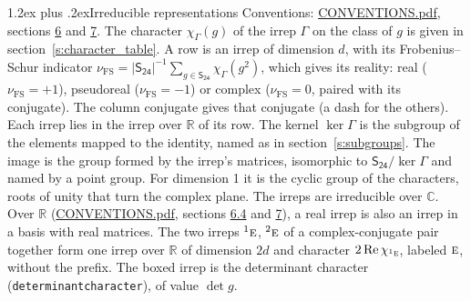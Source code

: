 \documentclass[10pt,a4paper]{article}
\makeatletter
\renewcommand\section{\@startsection{section}{1}{\z@}{-3ex plus -1ex minus -.2ex}%
  {1.2ex plus .2ex}{\normalfont\large\sffamily\bfseries\color{parttitle}}}
\numberwithin{equation}{section}
\newcommand{\grp}[1]{\mathsf{#1}}
\newcommand{\irr}[1]{\text{\normalfont\scshape #1}}
\newcommand{\conjpair}[1]{{}^{#1}}
\newcommand{\irchar}[1]{\chi_{#1}}
\newcommand{\fsind}{\nu_{\mathrm{FS}}}
\makeatother
\begin{document}
\section{Irreducible representations}\label{s:irreps}
Conventions: \href{../../CONVENTIONS.pdf}{CONVENTIONS.pdf}, sections \href{../../CONVENTIONS.pdf\#conv.6}{6} and \href{../../CONVENTIONS.pdf\#conv.7}{7}.
\leavevmode\label{n:function.character}\label{n:irrep.Gamma}The character $\irchar{\Gamma}(g)$ of the irrep $\Gamma$ on the class of $g$ is given in section~\ref{s:character_table}.
\leavevmode\label{n:index.dimension}\label{n:index.frobenius}\label{n:head.irrep}\label{n:head.reality}A row is an irrep of dimension $d$, with its Frobenius--Schur indicator $\fsind = |\grp{S_{24}}|^{-1}\allowbreak\sum_{g\in\grp{S_{24}}}\irchar{\Gamma}(g^2)$, which gives its reality: real ($\fsind = +1$), pseudoreal ($\fsind = -1$) or complex ($\fsind = 0$, paired with its conjugate). \label{n:head.conjugate}The column conjugate gives that conjugate (a dash for the others). \label{n:head.over.real}Each irrep lies in the irrep over $\mathbb{R}$ of its row. \label{n:head.kernel}The kernel $\ker\Gamma$ is the subgroup of the elements mapped to the identity, named as in section~\ref{s:subgroups}. \label{n:head.image}The image is the group formed by the irrep's matrices, isomorphic to $\grp{S_{24}}/\ker\Gamma$ and named by a point group. For dimension 1 it is the cyclic group of the characters, roots of unity that turn the complex plane. The irreps are irreducible over $\mathbb{C}$. Over $\mathbb{R}$ (\href{../../CONVENTIONS.pdf}{CONVENTIONS.pdf}, sections \href{../../CONVENTIONS.pdf\#conv.6.4}{6.4} and \href{../../CONVENTIONS.pdf\#conv.7}{7}), a real irrep is also an irrep in a basis with real matrices. The two irreps $\conjpair{1}\irr{e}$, $\conjpair{2}\irr{e}$ of a complex-conjugate pair together form one irrep over $\mathbb{R}$ of dimension $2d$ and character $2\operatorname{Re}\irchar{\conjpair{1}\irr{e}}$, labeled $\irr{e}$, without the prefix. \label{n:mark.determinant}The boxed irrep is the determinant character (\texttt{determinantcharacter}), of value $\det g$.
\setlength{\emergencystretch}{2em}\par\setlength{\emergencystretch}{0pt}
\end{document}
